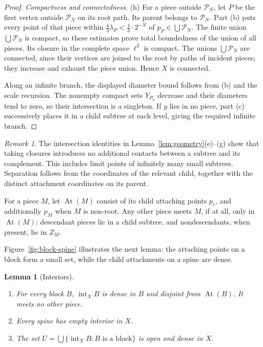 \documentclass[11pt]{amsart}
\newtheorem{lemma}[theorem]{Lemma}
\theoremstyle{definition}
\theoremstyle{remark}
\newtheorem{remark}[theorem]{Remark}
\newcommand{\intX}{\operatorname{int}_X}
\newcommand{\At}{\operatorname{At}}
\newcommand{\Pc}{\mathcal{P}}
\begin{document}
\begin{proof}
\emph{Compactness and connectedness.} (h) For a piece outside $\Pc_N$, let $P$ be the first vertex outside $\Pc_N$ on its root path. Its parent belongs to $\Pc_N$. Part (b) puts every point of that piece within $\frac43\lambda_P<\frac43\cdot2^{-N}$ of $p_P\in\bigcup\Pc_N$. The finite union $\bigcup\Pc_N$ is compact, so these estimates prove total boundedness of the union of all pieces. Its closure in the complete space $\ell^2$ is compact. The unions $\bigcup\Pc_N$ are connected, since their vertices are joined to the root by paths of incident pieces; they increase and exhaust the piece union. Hence $X$ is connected.

Along an infinite branch, the displayed diameter bound follows from (b) and the scale recursion. The nonempty compact sets $Y_{P_n}$ decrease and their diameters tend to zero, so their intersection is a singleton. If $y$ lies in no piece, part (c) successively places it in a child subtree at each level, giving the required infinite branch.
\end{proof}

\begin{remark}\label{rem:closures}
The intersection identities in Lemma~\ref{lem:geometry}(e)--(g) show that taking closures introduces no additional contacts between a subtree and its complement. This includes limit points of infinitely many small subtrees. Separation follows from the coordinates of the relevant child, together with the distinct attachment coordinates on its parent.
\end{remark}

For a piece $M$, let $\At(M)$ consist of its child attaching points $p_c$, and additionally $p_M$ when $M$ is non-root. Any other piece meets $M$, if at all, only in $\At(M)$: descendant pieces lie in a child subtree, and nondescendants, when present, lie in $Z_M$.

Figure~\ref{fig:block-spine} illustrates the next lemma: the attaching points on a block form a small set, while the child attachments on a spine are dense.

\begin{lemma}[Interiors]\label{lem:interiors}
\begin{enumerate}[label=\textup{(\alph*)}]
\item For every block $B$, $\intX B$ is dense in $B$ and disjoint from $\At(B)$. It meets no other piece.
\item Every spine has empty interior in $X$.
\item The set $U=\bigcup\{\intX B: B\text{ is a block}\}$ is open and dense in $X$.
\end{enumerate}
\end{lemma}
\end{document}
